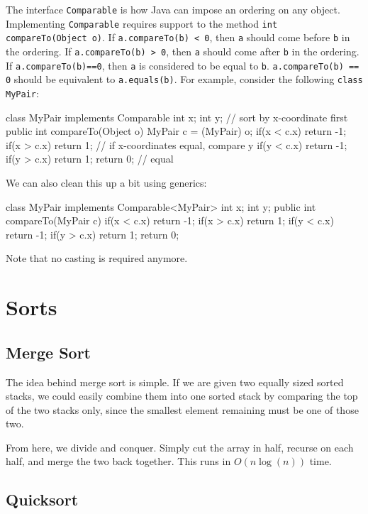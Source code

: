 \documentclass[11pt]{book}
\begin{document}
The interface \texttt{Comparable} is how Java can impose an ordering on any object. Implementing \texttt{Comparable} requires support to the method \texttt{int compareTo(Object o)}. If \texttt{a.compareTo(b) < 0}, then \texttt{a} should come before \texttt{b} in the ordering. If \texttt{a.compareTo(b) > 0}, then \texttt{a} should come after \texttt{b} in the ordering. If \texttt{a.compareTo(b)==0}, then \texttt{a} is considered to be equal to \texttt{b}. \texttt{a.compareTo(b) == 0} should be equivalent to \texttt{a.equals(b)}. For example, consider the following \texttt{class MyPair}:

\begin{mylstlisting}
class MyPair implements Comparable {
	int x;
	int y;
    // sort by x-coordinate first
	public int compareTo(Object o) {
		MyPair c = (MyPair) o;
		if(x < c.x) return -1;
		if(x > c.x) return 1;
		// if x-coordinates equal, compare y
		if(y < c.x) return -1;
		if(y > c.x) return 1;
		return 0; // equal
	}
}
\end{mylstlisting}

We can also clean this up a bit using generics:

\begin{mylstlisting}
class MyPair implements Comparable<MyPair> {
	int x;
	int y;
	public int compareTo(MyPair c) {
		if(x < c.x) return -1;
		if(x > c.x) return 1;
		if(y < c.x) return -1;
		if(y > c.x) return 1;
		return 0;
	}
}
\end{mylstlisting}

Note that no casting is required anymore.

\section{Sorts}

\subsection{Merge Sort}

The idea behind merge sort is simple. If we are given two equally sized sorted stacks, we could easily combine them into one sorted stack by comparing the top of the two stacks only, since the smallest element remaining must be one of those two.

From here, we divide and conquer. Simply cut the array in half, recurse on each half, and merge the two back together. This runs in $O(n \log (n))$ time.

\subsection{Quicksort}
\end{document}
